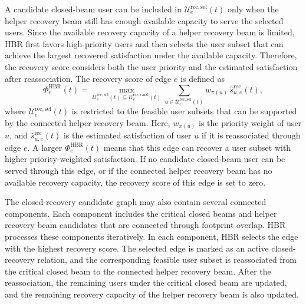 A candidate closed-beam user can be included in $\mathcal{U}_e^{\mathrm{rec,sel}}(t)$ only when the helper recovery beam still has enough available capacity to serve the selected users. Since the available recovery capacity of a helper recovery beam is limited, HBR first favors high-priority users and then selects the user subset that can achieve the largest recovered satisfaction under the available capacity. Therefore, the recovery score considers both the user priority and the estimated satisfaction after reassociation. The recovery score of edge $e$ is defined as
\begin{equation}
\label{eq:ch4_hbr_score}
\Phi_e^{\mathrm{HBR}}(t)=
\max_{\mathcal{U}_e^{\mathrm{rec,sel}}(t)\subseteq \mathcal{U}_e^{\mathrm{rec,cand}}(t)}
\sum_{u\in \mathcal{U}_e^{\mathrm{rec,sel}}(t)} w_{\pi(u)}\,\hat{s}_{u,e}^{\mathrm{rec}}(t),
\tag{11}
\end{equation}
where $\mathcal{U}_e^{\mathrm{rec,sel}}(t)$ is restricted to the feasible user subsets that can be supported by the connected helper recovery beam. Here, $w_{\pi(u)}$ is the priority weight of user $u$, and $\hat{s}_{u,e}^{\mathrm{rec}}(t)$ is the estimated satisfaction of user $u$ if it is reassociated through edge $e$. A larger $\Phi_e^{\mathrm{HBR}}(t)$ means that this edge can recover a user subset with higher priority-weighted satisfaction. If no candidate closed-beam user can be served through this edge, or if the connected helper recovery beam has no available recovery capacity, the recovery score of this edge is set to zero.

The closed-recovery candidate graph may also contain several connected components. Each component includes the critical closed beams and helper recovery beam candidates that are connected through footprint overlap. HBR processes these components iteratively. In each component, HBR selects the edge with the highest recovery score. The selected edge is marked as an active closed-recovery relation, and the corresponding feasible user subset is reassociated from the critical closed beam to the connected helper recovery beam. After the reassociation, the remaining users under the critical closed beam are updated, and the remaining recovery capacity of the helper recovery beam is also updated.

